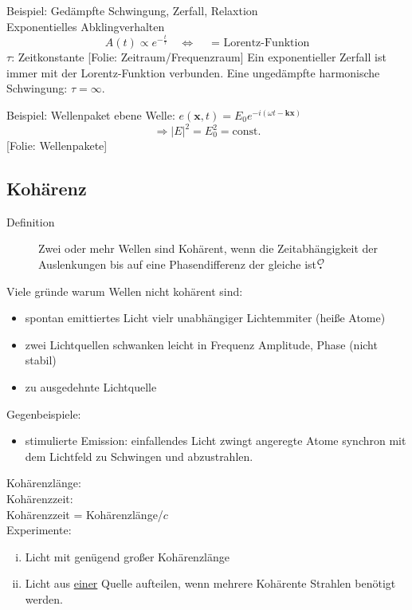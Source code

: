 \documentclass[titlepage,11pt,a4paper,ngerman]{report}
\newcommand{\tx}[1]{\textrm{#1}}
\newcommand{\const}{\tx{const.}}
\newcommand{\folie}[1]{\color{gray}[Folie: #1]\color{black}}
\renewcommand{\vec}[1]{\boldsymbol{#1}}
\newcommand{\lcom}[1]{\color{MidnightBlue}#1\color{black}}
\newcommand{\mau}{$\buildrel \mathcal{O} \over{\textbf{.}}$}
\begin{document}
Beispiel: Gedämpfte Schwingung, Zerfall, Relaxtion\\
Exponentielles Abklingverhalten
$$A(t) \propto e^{-\frac{t}{\tau}} \quad \Leftrightarrow \quad \textrm{ = Lorentz-Funktion}$$
$\tau$: Zeitkonstante
\folie{Zeitraum/Frequenzraum}
\lcom{Ein exponentieller Zerfall ist immer mit der Lorentz-Funktion verbunden. Eine ungedämpfte harmonische Schwingung: $\tau = \infty$.}


Beispiel: Wellenpaket
ebene Welle: $e(\vec{x},t) = E_0 e^{-i(\omega t - \vec{k} \vec{x})}$
$$\Rightarrow |E|^2 = E_0^2 = \const$$
\folie{Wellenpakete}


\subsection{Kohärenz}
\begin{description}
	\item[Definition] Zwei oder mehr Wellen sind Kohärent, wenn die Zeitabhängigkeit der Auslenkungen bis auf eine Phasendifferenz der gleiche ist\mau
\end{description}
Viele gründe warum Wellen nicht kohärent sind:
\begin{itemize}
	\item spontan emittiertes Licht vielr unabhängiger Lichtemmiter (heiße Atome)
	\item zwei Lichtquellen schwanken leicht in Frequenz Amplitude, Phase (nicht stabil)
	\item zu ausgedehnte Lichtquelle
\end{itemize}
Gegenbeispiele:
\begin{itemize}
	\item stimulierte Emission: einfallendes Licht zwingt angeregte Atome synchron mit dem Lichtfeld zu Schwingen und abzustrahlen.
\end{itemize}
Kohärenzlänge:\\ %
Kohärenzzeit:\\
	Kohärenzzeit = Kohärenzlänge/$c$\\
Experimente: 
\begin{enumerate}[(i)]
	\item Licht mit genügend großer Kohärenzlänge
	\item Licht aus \underline{einer} Quelle aufteilen, wenn mehrere Kohärente Strahlen benötigt werden.
\end{enumerate}
\end{document}
